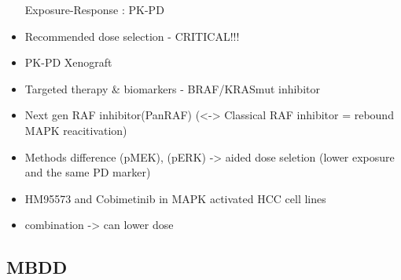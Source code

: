 \documentclass[]{book}
\begin{document}
\begin{itemize}
  Exposure-Response : PK-PD
\item
  Recommended dose selection - CRITICAL!!!
\item
  PK-PD Xenograft
\item
  Targeted therapy \& biomarkers - BRAF/KRASmut inhibitor
\item
  Next gen RAF inhibitor(PanRAF) (\textless{}-\textgreater{} Classical
  RAF inhibitor = rebound MAPK reacitivation)
\item
  Methods difference (pMEK), (pERK) -\textgreater{} aided dose seletion
  (lower exposure and the same PD marker)
\item
  HM95573 and Cobimetinib in MAPK activated HCC cell lines
\item
  combination -\textgreater{} can lower dose
\end{itemize}

\subsection{MBDD}\label{mbdd}
\end{document}

